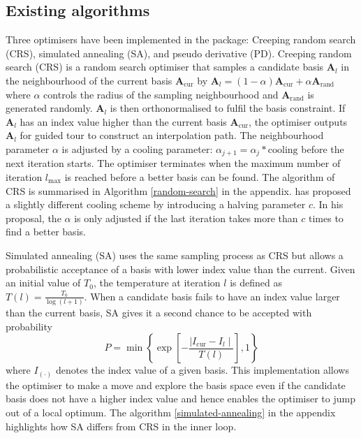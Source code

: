 \hypertarget{existing-algorithms}{%
\subsection{Existing algorithms}\label{existing-algorithms}}

Three optimisers have been implemented in the  \citep{tourr}
package: Creeping random search (CRS), simulated annealing (SA), and
pseudo derivative (PD). Creeping random search (CRS) is a random search
optimiser that samples a candidate basis \(\mathbf{A}_{l}\) in the
neighbourhood of the current basis \(\mathbf{A}_{\text{cur}}\) by
\(\mathbf{A}_{l} = (1- \alpha)\mathbf{A}_{\text{cur}} + \alpha \mathbf{A}_{\text{rand}}\)
where \(\alpha\) controls the radius of the sampling neighbourhood and
\(\mathbf{A}_{\text{rand}}\) is generated randomly. \(\mathbf{A}_{l}\)
is then orthonormalised to fulfil the basis constraint. If
\(\mathbf{A}_{l}\) has an index value higher than the current basis
\(\mathbf{A}_{\text{cur}}\), the optimiser outputs \(\mathbf{A}_{l}\)
for guided tour to construct an interpolation path. The neighbourhood
parameter \(\alpha\) is adjusted by a cooling parameter:
\(\alpha_{j+1} = \alpha_j * \text{cooling}\) before the next iteration
starts. The optimiser terminates when the maximum number of iteration
\(l_{\max}\) is reached before a better basis can be found. The
algorithm of CRS is summarised in Algorithm \ref{random-search} in the
appendix. \citet{posse1995projection} has proposed a slightly different
cooling scheme by introducing a halving parameter \(c\). In his
proposal, the \(\alpha\) is only adjusted if the last iteration takes
more than \(c\) times to find a better basis.

Simulated annealing (SA) uses the same sampling process as CRS but
allows a probabilistic acceptance of a basis with lower index value than
the current. Given an initial value of \(T_0\), the temperature at
iteration \(l\) is defined as \(T(l) = \frac{T_0}{\log(l + 1)}\). When a
candidate basis fails to have an index value larger than the current
basis, SA gives it a second chance to be accepted with probability
\[P= \min\left\{\exp\left[-\frac{\mid I_{\text{cur}} - I_{l} \mid}{T(l)}\right],1\right\}\]
where \(I_{(\cdot)}\) denotes the index value of a given basis. This
implementation allows the optimiser to make a move and explore the basis
space even if the candidate basis does not have a higher index value and
hence enables the optimiser to jump out of a local optimum. The
algorithm \ref{simulated-annealing} in the appendix highlights how SA
differs from CRS in the inner loop.

